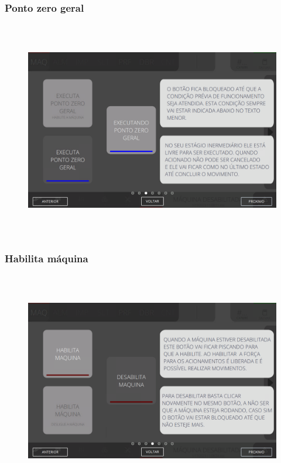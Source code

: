 \vspace*{\fill}

\newpage
\thispagestyle{fancy}

\vspace*{\fill}

\subsubsection{\small{Ponto zero geral}}

\begin{figure}[h]
  \centering
  \includegraphics[width=576px,height=360px]{src/imagesFlexo/02-machine/e-3.png}
\end{figure}

\vspace*{\fill}

\newpage
\thispagestyle{fancy}

\vspace*{\fill}

\subsubsection{\small{Habilita máquina}}

\begin{figure}[h]
  \centering
  \includegraphics[width=576px,height=360px]{src/imagesFlexo/02-machine/e-4.png}
\end{figure}

